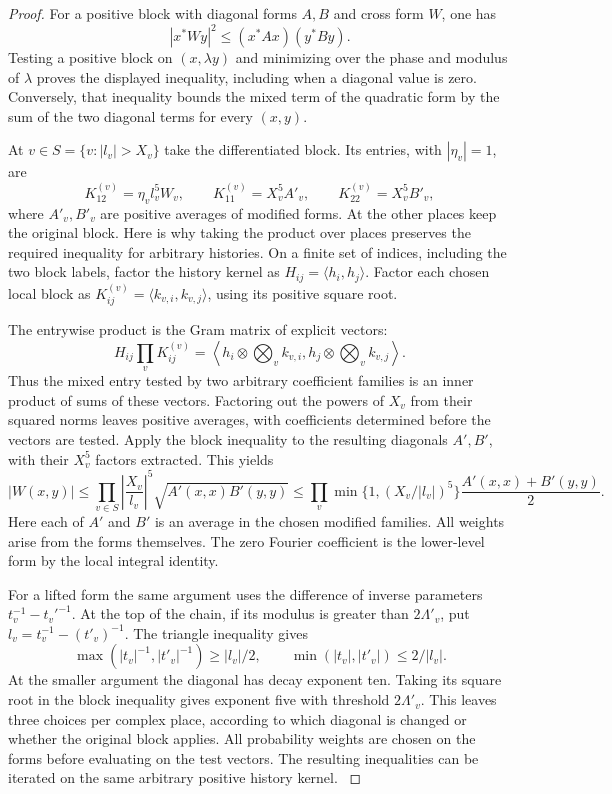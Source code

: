\begin{proof}
For a positive block with diagonal forms \(A,B\) and cross form
\(W\), one has
\[
 |x^*Wy|^2\le (x^*Ax)(y^*By).
\]
Testing a positive block on \((x,\lambda y)\) and minimizing
over the phase and modulus of \(\lambda\) proves the displayed
inequality, including when a diagonal value is zero. Conversely,
that inequality bounds the mixed term of the quadratic form by
the sum of the two diagonal terms for every \((x,y)\).

At \(v\in S=\{v:|l_v|>X_v\}\) take the differentiated block. Its entries, with \(|\eta_v|=1\), are
\[
 K^{(v)}_{12}=\eta_v l_v^5 W_v,\qquad
 K^{(v)}_{11}=X_v^5 A'_v,\qquad K^{(v)}_{22}=X_v^5 B'_v ,
\]
where \(A'_v,B'_v\) are positive averages of modified forms. At the other places keep the original block.
Here is why taking the product over places preserves the required inequality for arbitrary histories. On a finite set of indices, including the two block labels, factor the history kernel as \(H_{ij}=\langle h_i,h_j\rangle\). Factor each chosen local block as \(K^{(v)}_{ij}=\langle k_{v,i},k_{v,j}\rangle\), using its positive square root.

The entrywise product is the Gram matrix of explicit vectors:
\[
 H_{ij}\prod_v K^{(v)}_{ij}
   =\left\langle h_i\otimes\bigotimes_v k_{v,i},
                   h_j\otimes\bigotimes_v k_{v,j}\right\rangle .
\]
Thus the mixed entry tested by two arbitrary coefficient families is an inner product of sums of these vectors. Factoring out the powers of \(X_v\) from their squared norms leaves positive averages, with coefficients determined before the vectors are tested. Apply the block inequality to the resulting diagonals \(A',B'\),
with their \(X_v^5\) factors extracted. This yields
\[
 |W(x,y)|\le
  \prod_{v\in S}\left|\frac{X_v}{l_v}\right|^5
                \sqrt{A'(x,x)B'(y,y)}
 \le \prod_v\min\{1,(X_v/|l_v|)^5\}
              \frac{A'(x,x)+B'(y,y)}{2}.
\]
Here each of \(A'\) and \(B'\) is an average in the chosen
modified families. All weights arise from the forms themselves. The zero Fourier coefficient
is the lower-level form by the local integral identity.

For a lifted form the same argument uses the difference of
inverse parameters \(t_v^{-1}-t_v'^{-1}\). At the top of the
chain, if its modulus is greater than \(2\Lambda'_v\), put \(l_v=t_v^{-1}-(t'_v)^{-1}\). The triangle inequality
gives
\[
 \max(|t_v|^{-1},|t'_v|^{-1})\ge |l_v|/2,
 \qquad \min(|t_v|,|t'_v|)\le 2/|l_v|.
\]
At the smaller argument the diagonal has decay exponent ten.
Taking its square root in the block inequality gives exponent
five with threshold \(2\Lambda'_v\). This leaves
three choices per complex place, according to which diagonal
is changed or whether the original block applies. All probability
weights are chosen on the forms before evaluating on the test
vectors. The resulting inequalities can be iterated on the
same arbitrary positive history kernel. \label{cor:block-recursion-1}

\end{proof}

